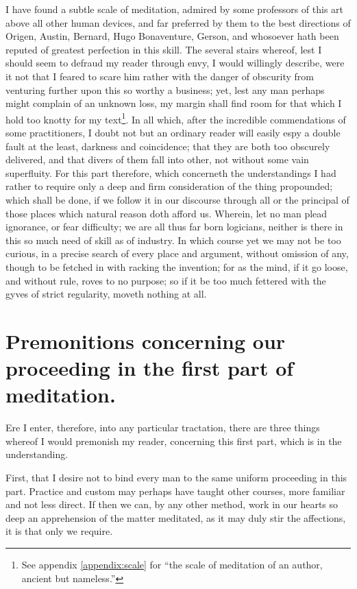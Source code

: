 I have found a subtle scale of meditation, admired by some professors of this art above all other human devices, and far preferred by them to the best directions of Origen, Austin, Bernard, Hugo Bonaventure, Gerson, and whosoever hath been reputed of greatest perfection in this skill. The several stairs whereof, lest I should seem to defraud my reader through envy, I would willingly describe, were it not that I feared to scare him rather with the danger of obscurity from venturing further upon this so worthy a business; yet, lest any man perhaps might complain of an unknown loss, my margin shall find room for that which I hold too knotty for my text\footnote{See appendix \ref{appendix:scale} for ``the scale of meditation of an author, ancient but nameless.''}. In all which, after the incredible commendations of some practitioners, I doubt not but an ordinary reader will easily espy a double fault at the least, darkness and coincidence; that they are both too obscurely delivered, and that divers of them fall into other, not without some vain superfluity. For this part therefore, which concerneth the understandings I had rather to require only a deep and firm consideration of the thing propounded; which shall be done, if we follow it in our discourse through all or the principal of those places which natural reason doth afford us. Wherein, let no man plead ignorance, or fear difficulty; we are all thus far born logicians, neither is there in this so much need of skill as of industry. In which course yet we may not be too curious, in a precise search of every place and argument, without omission of any, though to be fetched in with racking the invention; for as the mind, if it go loose, and without rule, roves to no purpose; so if it be too much fettered with the gyves of strict regularity, moveth nothing at all. 

\section{Premonitions concerning our proceeding in the first part of meditation.}
Ere I enter, therefore, into any particular tractation, there are three things whereof I would premonish my reader, concerning this first part, which is in the understanding. 

First, that I desire not to bind every man to the same uniform proceeding in this part. Practice and custom may perhaps have taught other courses, more familiar and not less direct. If then we can, by any other method, work in our hearts so deep an apprehension of the matter meditated, as it may duly stir the affections, it is that only we require. 

